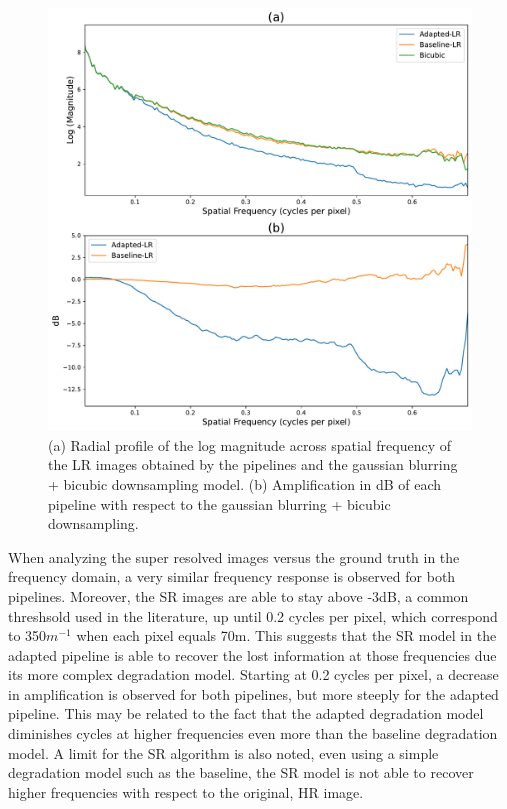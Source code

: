         \begin{figure}[H]
            \centering
            \includegraphics[scale=0.45]{Includes/5-lr-images-fft-comparison.pdf}
            \caption{(a) Radial profile of the log magnitude across spatial frequency of the LR images obtained by the pipelines and the gaussian blurring + bicubic downsampling model.
                     (b) Amplification in dB of each pipeline with respect to the gaussian blurring + bicubic downsampling.}
            \label{fig:5-lr-images-fft-comparison.pdf}
        \end{figure}

        When analyzing the super resolved images versus the ground truth in the frequency domain, a very similar frequency response is observed for both pipelines.
        Moreover, the SR images are able to stay above -3dB, a common threshsold used in the literature, up until 0.2 cycles per pixel, which correspond to 350$m^{-1}$ when each pixel equals 70m.
        This suggests that the SR model in the adapted pipeline is able to recover the lost information at those frequencies due its more complex degradation model.
        Starting at 0.2 cycles per pixel, a decrease in amplification is observed for both pipelines, but more steeply for the adapted pipeline.
        This may be related to the fact that the adapted degradation model diminishes cycles at higher frequencies even more than the baseline degradation model. 
        A limit for the SR algorithm is also noted, even using a simple degradation model such as the baseline, the SR model is not able to recover higher frequencies with respect to the original, HR image.

